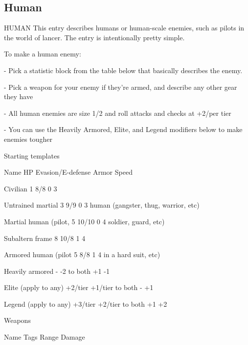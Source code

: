 \subsection{Human}
                                                HUMAN
This entry describes humans or human-scale enemies, such as pilots in the world of lancer. The
entry is intentionally pretty simple.


To make a human enemy:

            -   Pick a statistic block from the table below that basically describes the enemy.

            -   Pick a weapon for your enemy if they’re armed, and describe any other gear they
                have

            -   All human enemies are size 1/2 and roll attacks and checks at +2/per tier

            -   You can use the Heavily Armored, Elite, and Legend modifiers below to make
                enemies tougher


                                           Starting templates

 Name                        HP         Evasion/E-defense            Armor                   Speed

 Civilian                    1          8/8                          0                       3

 Untrained martial           3          9/9                          0                       3
 human (gangster, thug,
 warrior, etc)

 Martial human (pilot,       5          10/10                        0                       4
 soldier, guard, etc)

 Subaltern frame             8          10/8                         1                       4

 Armored human (pilot        5          8/8                          1                       4
 in a hard suit, etc)

 Heavily armored             -          -2 to both                   +1                      -1

 Elite (apply to any)        +2/tier    +1/tier to both              -                       +1

 Legend (apply to any)       +3/tier    +2/tier to both              +1                      +2

                                                Weapons

 Name                        Tags                          Range                    Damage

